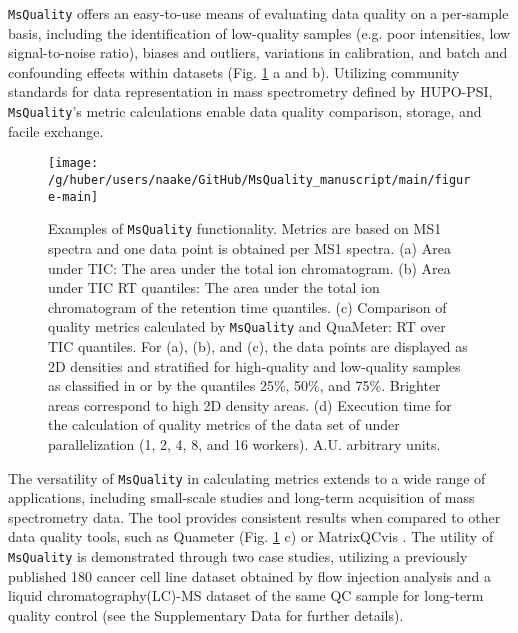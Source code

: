 \documentclass{bioinfo}
\begin{document}
\texttt{MsQuality} offers an easy-to-use means of evaluating data quality on a 
per-sample basis, including the identification of low-quality samples 
(e.g. poor intensities, low signal-to-noise ratio), biases and outliers, 
variations in calibration, and batch and confounding effects within datasets
(Fig. \ref{fig:fig1} a and b). 
Utilizing community standards for data representation in mass spectrometry 
defined by HUPO-PSI, \texttt{MsQuality}'s metric calculations enable 
data quality comparison, storage, and facile exchange.

\begin{figure}[ht!]
    \centering
 	\texttt{[image: /g/huber/users/naake/GitHub/MsQuality\_manuscript/main/figure-main]}
 	  \caption{Examples of \texttt{MsQuality} functionality. Metrics are based
 	        on MS1 spectra and one data point is obtained per MS1 spectra.
 	        (a) Area under TIC: The area under the total ion chromatogram. 
            (b) Area under TIC RT quantiles: The area under the total ion
                chromatogram of the retention time quantiles. 
            (c) Comparison of quality metrics calculated by \texttt{MsQuality} 
                and QuaMeter: RT over TIC quantiles. 
            For (a), (b), and (c), the data points are displayed 
                as 2D densities and stratified for high-quality and low-quality
                samples as classified in \cite{Amidan2014} or by the
                quantiles 25\%, 50\%, and 75\%. Brighter areas correspond to 
                high 2D density areas.
            (d) Execution time for the calculation of quality metrics of the 
                data set of \cite{Amidan2014} under parallelization 
                (1, 2, 4, 8, and 16 workers). A.U. arbitrary units.
    } \label{fig:fig1}
\end{figure}

The versatility of \texttt{MsQuality} in calculating metrics extends to a 
wide range of applications, including small-scale studies and long-term 
acquisition of mass spectrometry data. The tool provides consistent results 
when compared to other data quality tools, such as Quameter \citep{Ma2012} 
(Fig. \ref{fig:fig1} c) or MatrixQCvis \citep{Naake2022}. 
The utility of \texttt{MsQuality} is demonstrated through two case studies, 
utilizing a previously published 180 cancer cell line dataset obtained by 
flow injection analysis \citep{Cherkaoui2022} and a liquid 
chromatography(LC)-MS dataset of
the same QC sample \citep{Amidan2014} for long-term quality control 
(see the Supplementary Data for further details).
\end{document}
